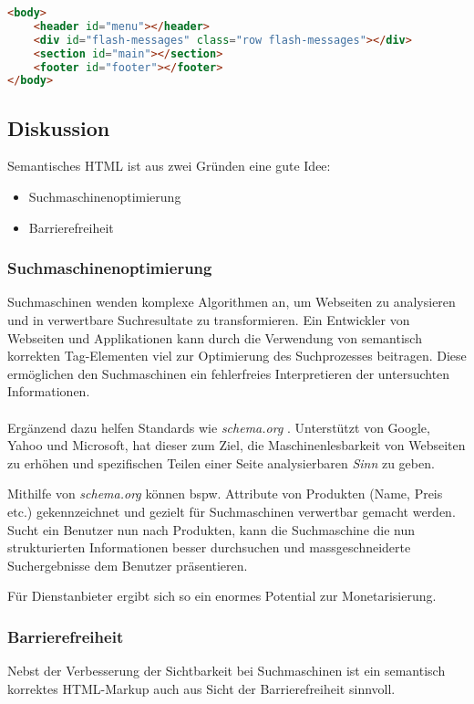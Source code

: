 \begin{lstlisting}[language=HTML, caption=Layout Definition \cite{roomiesHtmlSkeleton}, label=lst:layoutDefinition, firstnumber=27]
<body>
	<header id="menu"></header>
	<div id="flash-messages" class="row flash-messages"></div>
	<section id="main"></section>
	<footer id="footer"></footer>
</body>
\end{lstlisting}

\newpage
\subsection*{Diskussion}
Semantisches HTML ist aus zwei Gründen eine gute Idee:
\begin{itemize}
	\item Suchmaschinenoptimierung
	\item Barrierefreiheit
\end{itemize}

\subsubsection*{Suchmaschinenoptimierung}
Suchmaschinen wenden komplexe Algorithmen an, um Webseiten zu analysieren und in verwertbare Suchresultate zu transformieren. Ein Entwickler von Webseiten und Applikationen kann durch die Verwendung von semantisch korrekten Tag-Elementen viel zur Optimierung des Suchprozesses beitragen. Diese ermöglichen den Suchmaschinen ein fehlerfreies Interpretieren der untersuchten Informationen.
\\ \\
Ergänzend dazu helfen Standards wie \emph{schema.org} \cite{SchemaOrg}. Unterstützt von Google, Yahoo und Microsoft, hat dieser zum Ziel, die Maschinenlesbarkeit von Webseiten zu erhöhen und spezifischen Teilen einer Seite analysierbaren \emph{Sinn} zu geben.

Mithilfe von \emph{schema.org} können bspw. Attribute von Produkten (Name, Preis etc.) gekennzeichnet und gezielt für Suchmaschinen verwertbar gemacht werden. Sucht ein Benutzer nun nach Produkten, kann die Suchmaschine die nun strukturierten Informationen besser durchsuchen und massgeschneiderte Suchergebnisse dem Benutzer präsentieren.

Für Dienstanbieter ergibt sich so ein enormes Potential zur Monetarisierung.

\subsubsection*{Barrierefreiheit}
Nebst der Verbesserung der Sichtbarkeit bei Suchmaschinen ist ein semantisch korrektes HTML-Markup auch aus Sicht der Barrierefreiheit sinnvoll.

